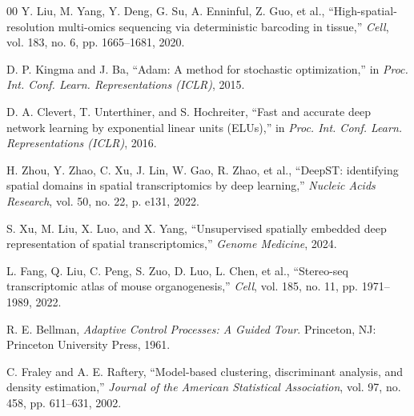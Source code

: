 \documentclass[conference]{IEEEtran}
\begin{document}
\begin{thebibliography}{00}
Y. Liu, M. Yang, Y. Deng, G. Su, A. Enninful, Z. Guo, et al.,
``High-spatial-resolution multi-omics sequencing via deterministic barcoding in tissue,''
\textit{Cell}, vol. 183, no. 6, pp. 1665--1681, 2020.

D. P. Kingma and J. Ba,
``Adam: A method for stochastic optimization,''
in \textit{Proc. Int. Conf. Learn. Representations (ICLR)}, 2015.

D. A. Clevert, T. Unterthiner, and S. Hochreiter,
``Fast and accurate deep network learning by exponential linear units (ELUs),''
in \textit{Proc. Int. Conf. Learn. Representations (ICLR)}, 2016.

H. Zhou, Y. Zhao, C. Xu, J. Lin, W. Gao, R. Zhao, et al.,
``DeepST: identifying spatial domains in spatial transcriptomics by deep learning,''
\textit{Nucleic Acids Research}, vol. 50, no. 22, p. e131, 2022.

S. Xu, M. Liu, X. Luo, and X. Yang,
``Unsupervised spatially embedded deep representation of spatial transcriptomics,''
\textit{Genome Medicine}, 2024.

L. Fang, Q. Liu, C. Peng, S. Zuo, D. Luo, L. Chen, et al.,
``Stereo-seq transcriptomic atlas of mouse organogenesis,''
\textit{Cell}, vol. 185, no. 11, pp. 1971--1989, 2022.

R. E. Bellman,
\textit{Adaptive Control Processes: A Guided Tour}.
Princeton, NJ: Princeton University Press, 1961.

C. Fraley and A. E. Raftery,
``Model-based clustering, discriminant analysis, and density estimation,''
\textit{Journal of the American Statistical Association}, vol. 97, no. 458, pp. 611--631, 2002.

\end{thebibliography}
\end{document}
